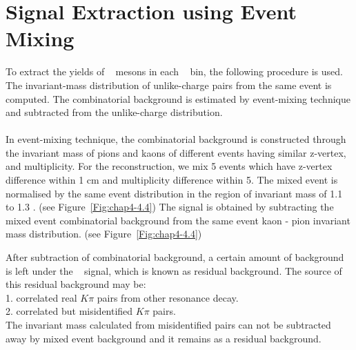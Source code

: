 \section{Signal Extraction using Event Mixing}
\label{par:4.3}
To extract the yields of \kzero~ mesons in each \pT~ bin, the following procedure is used. The invariant-mass distribution of unlike-charge pairs from the same event is computed. The combinatorial background is estimated by event-mixing technique and subtracted from the unlike-charge distribution. \\
\\
In event-mixing technique, the combinatorial background is constructed through the invariant mass of pions and kaons of different events having similar z-vertex, and multiplicity. For the reconstruction, we mix 5 events which have z-vertex difference within 1 cm and multiplicity difference within 5. The mixed event is normalised by the same event distribution in the region of invariant mass of 1.1 to 1.3 \GeVcSq. (see \mbox{Figure \ref{Fig:chap4-4.4}})
The signal is obtained by subtracting the mixed event combinatorial background from the same event kaon - pion invariant mass distribution. (see \mbox{Figure \ref{Fig:chap4-4.4}})


After subtraction of combinatorial background, a certain amount of background is left under the \kzero~ signal, which is known as residual background. The source of this residual background may be:
\\
1. correlated real $K\pi$ pairs from other resonance decay.
\\
2. correlated but misidentified $K\pi$ pairs.
\\
 The invariant mass calculated from misidentified pairs can not be subtracted away by mixed event background and it remains as a residual background.





